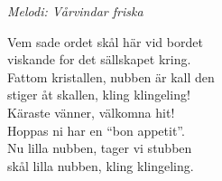 {\footnotesize\textit{Melodi: Vårvindar friska}}\par
\vspace{10pt}
Vem sade ordet skål här vid bordet\\
viskande for det sällskapet kring.\\
Fattom kristallen, nubben är kall den\\
stiger åt skallen, kling klingeling!\\
Käraste vänner, välkomna hit!\\
Hoppas ni har en ``bon appetit''.\\
Nu lilla nubben, tager vi stubben\\
skål lilla nubben, kling klingeling.
